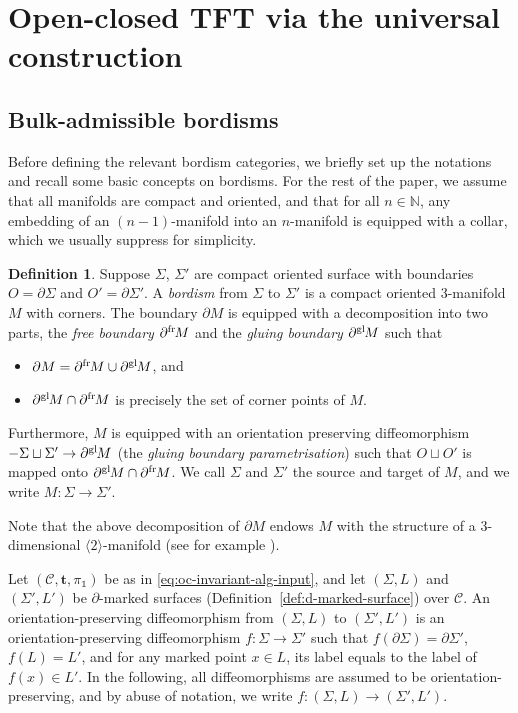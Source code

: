 \documentclass[11pt]{amsart}
\theoremstyle{definition}
\newtheorem{definition}[thm]{Definition}
\numberwithin{equation}{section}
\def\bd{{\partial}}
\def\mtr{{\mathbf{t}}} %
\newcommand{\bdf}[1]{{\bd^{\operatorname{fr}}\hspace{-1pt}{#1}}}
\newcommand{\bdg}[1]{{\bd^{\operatorname{gl}}\hspace{-1pt}{#1}}}
\def\cC{\mathcal{C}}
\def\bN{{\mathbb{N}}}
\def\1{{\mathds{1}}}
\def\to{\rightarrow}
\begin{document}
\section{Open-closed TFT via the universal construction}\label{sec:ocTFT}

\subsection{Bulk-admissible bordisms}

Before defining the relevant bordism categories, we briefly set up the notations and recall some basic concepts on bordisms. For the rest of the paper, we assume that all manifolds are compact and oriented, and that for all $n \in \bN$, any embedding of an $(n-1)$-manifold into an $n$-manifold is equipped with a collar, which we usually suppress for simplicity. 

\begin{definition}\label{def:cob-sigma}
Suppose $\Sigma$, $\Sigma'$ are compact oriented surface with boundaries $O = \bd\Sigma$ and $O' = \bd\Sigma'$. 
A \emph{bordism} from $\Sigma$ to $\Sigma'$ is a compact oriented 3-manifold $M$ with corners.
The boundary $\bd M$ is equipped with a decomposition into two parts, the \textit{free boundary} $\bdf M$ and the \textit{gluing boundary} $\bdg M$ such that 
\begin{itemize}
\item $\bd M = \bdf M \cup \bdg M$, and
\item $\bdg M \cap \bdf M$ is precisely the set of corner points of $M$.
\end{itemize}
Furthermore, $M$ is equipped with an orientation preserving diffeomorphism $-\Sigma \sqcup \Sigma' \to \bdg M$ (the \textit{gluing boundary parametrisation}) such that $O \sqcup O'$ is mapped onto $\bdg M \cap \bdf M$.
We call $\Sigma$ and $\Sigma'$ the source and target of $M$, and we write $M: \Sigma \to \Sigma'$.
\end{definition}

Note that the above decomposition of $\bd M$ endows $M$ with the structure of a 3-dimensional $\langle 2 \rangle$-manifold (see for example \cite{LP08, HR24}). 

Let $(\cC, \mtr, \pi_\1)$ be as in \eqref{eq:oc-invariant-alg-input}, and let $(\Sigma, L)$ and $(\Sigma', L')$ be $\bd$-marked surfaces (Definition~\ref{def:d-marked-surface}) over $\cC$. An orientation-preserving diffeomorphism from $(\Sigma, L)$ to $(\Sigma', L')$ is an orientation-preserving diffeomorphism $f: \Sigma \to \Sigma'$ such that $f(\bd\Sigma)=\bd\Sigma'$, $f(L)=L'$, and for any marked point $x \in L$, its label equals to the label of $f(x) \in L'$. In the following, all diffeomorphisms are assumed to be orientation-preserving, and by abuse of notation, we write $f: (\Sigma, L) \to (\Sigma', L')$. 
\end{document}
